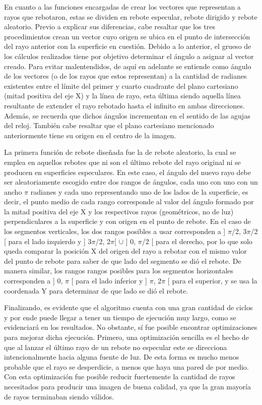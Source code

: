 \documentclass[conference]{IEEEtran}
\begin{document}
En cuanto a las funciones encargadas de crear los vectores que representan a rayos que rebotaron, estas se dividen en rebote especular, rebote dirigido y rebote aleatorio.  Previo a explicar sus diferencias, cabe resaltar que los tres procedimientos crean un vector cuyo origen se ubica en el punto de intersección del rayo anterior con la superficie en cuestión. Debido a lo anterior, el grueso de los cálculos realizados tiene por objetivo determinar el ángulo a asignar al vector creado. Para evitar malentendidos, de aquí en adelante se entiende como ángulo de los vectores (o de los rayos que estos representan) a la cantidad de radianes existentes entre el límite del primer y cuarto cuadrante del plano cartesiano (mitad positiva del eje X) y la línea de rayo, esta última siendo aquella línea resultante de extender el rayo rebotado hasta el infinito en ambas direcciones. Además, se recuerda que dichos ángulos incrementan en el sentido de las agujas del reloj. También cabe resaltar que el plano cartesiano mencionado anteriormente tiene su origen en el centro de la imagen.

La primera función de rebote diseñada fue la de rebote aleatorio, la cual se emplea en aquellos rebotes que ni son el último rebote del rayo original ni se producen en superficies especulares. En este caso, el ángulo del nuevo rayo debe ser aleatoriamente escogido entre dos rangos de ángulos, cada uno con uno con un ancho $\pi$ radianes y cada uno representando uno de los lados de la superficie, es decir, el punto medio de cada rango corresponde al valor del ángulo formado por la mitad positiva del eje X y los respectivos rayos (geométricos, no de luz) perpendiculares a la superficie y con origen en el punto de rebote. En el caso de los segmentos verticales, los dos rangos posibles a usar corresponden a ] $\pi$/2, 3$\pi$/2 [ para el lado izquierdo y ] 3$\pi$/2, 2$\pi$[ $\cup$ ] 0,  $\pi$/2 [ para el derecho, por lo que solo queda comparar la posición X del origen del rayo a rebotar con el mismo valor del punto de rebote para saber de que lado del segmento se dió el rebote. De manera similar, los rangos rangos posibles para los segmentos horizontales corresponden a ] 0, $\pi$ [ para el lado inferior y ]  $\pi$,  2$\pi$ [ para el superior, y se usa la coordenada Y para determinar de que lado se dió el rebote. 

Finalizando, es evidente que el algoritmo cuenta con una gran cantidad de ciclos y por ende puede llegar a tener un tiempo de ejecución muy largo, como se evidenciará en los resultados. No obstante, sí fue posible encontrar optimizaciones para mejorar dicha ejecución. Primero, una optimización sencilla es el hecho de que al lanzar el último rayo de un rebote no especular este se direcciona intencionalmente hacia alguna fuente de luz. De esta forma es mucho menos probable que el rayo se desperdicie, a menos que haya una pared de por medio. Con esta optimización fue posible reducir fuertemente la cantidad de rayos necesitados para producir una imagen de buena calidad, ya que la gran mayoría de rayos terminaban siendo válidos. 
\end{document}
